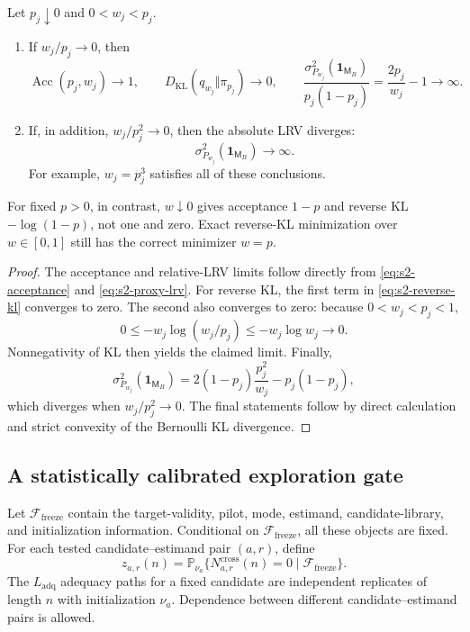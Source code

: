 \begin{corollary}
\label{cor:s2-proxy-limits}
Let \(p_j\downarrow0\) and \(0<w_j<p_j\).
\begin{enumerate}[label=\textnormal{(\roman*)}]
\item If \(w_j/p_j\to0\), then
\[
 \operatorname{Acc}(p_j,w_j)\to1,
 \qquad
 D_{\mathrm{KL}}(q_{w_j}\Vert\pi_{p_j})\to0,
 \qquad
 \frac{\sigma_{P_{w_j}}^2(\mathbf 1_{\mathsf M_B})}
      {p_j(1-p_j)}
 =
 \frac{2p_j}{w_j}-1
 \to\infty.
\]
\item If, in addition, \(w_j/p_j^2\to0\), then the absolute LRV diverges:
\[
 \sigma_{P_{w_j}}^2(\mathbf 1_{\mathsf M_B})\to\infty.
\]
For example, \(w_j=p_j^3\) satisfies all of these conclusions.
\end{enumerate}
For fixed \(p>0\), in contrast, \(w\downarrow0\) gives acceptance
\(1-p\) and reverse KL \(-\log(1-p)\), not one and zero.  Exact reverse-KL
minimization over \(w\in[0,1]\) still has the correct minimizer \(w=p\).
\end{corollary}

\begin{proof}
The acceptance and relative-LRV limits follow directly from
\eqref{eq:s2-acceptance} and \eqref{eq:s2-proxy-lrv}.  For reverse KL, the
first term in \eqref{eq:s2-reverse-kl} converges to zero.  The second also
converges to zero: because \(0<w_j<p_j<1\),
\[
 0\leq -w_j\log(w_j/p_j)
 \leq -w_j\log w_j\longrightarrow0.
\]
Nonnegativity of KL then yields the claimed limit.  Finally,
\[
 \sigma_{P_{w_j}}^2(\mathbf 1_{\mathsf M_B})
 =
 2(1-p_j)\frac{p_j^2}{w_j}-p_j(1-p_j),
\]
which diverges when \(w_j/p_j^2\to0\).  The final statements follow by direct
calculation and strict convexity of the Bernoulli KL divergence.
\end{proof}
\subsection{A statistically calibrated exploration gate}
\label{subsec:stage2-exploration}

Let \(\mathcal F_{\mathrm{freeze}}\) contain the target-validity, pilot, mode,
estimand, candidate-library, and initialization information.  Conditional on
\(\mathcal F_{\mathrm{freeze}}\), all these objects are fixed.  For each
tested candidate--estimand pair \((a,r)\), define
\begin{equation}
 z_{a,r}(n)
 =
 \mathbb P_{\nu_a}
 \{N_{a,r}^{\mathrm{cross}}(n)=0
   \mid\mathcal F_{\mathrm{freeze}}\}.
 \label{eq:s2-zero-cross-prob}
\end{equation}
The \(L_{\mathrm{adq}}\) adequacy paths for a fixed candidate are independent
replicates of length \(n\) with initialization \(\nu_a\).  Dependence between
different candidate--estimand pairs is allowed.

